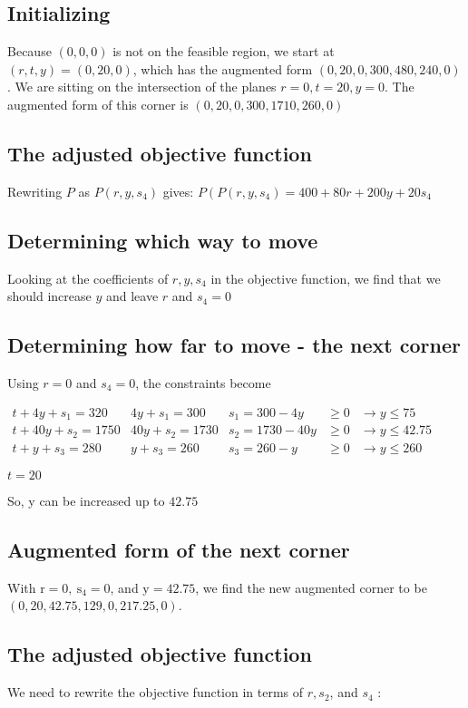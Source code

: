 \subsection{Initializing}
Because $(0,0,0)$ is not on the feasible region, we start at $(r, t, y)=(0,20,0)$, which has the augmented form $(0,20,0,300,480,240,0)$. We are sitting on the intersection of the planes $r=0, t=20, y=0$. The augmented form of this corner is $(0,20,0,300,1710,260,0)$

\subsection{The adjusted objective function}
Rewriting $P$ as $P\left(r, y, s_{4}\right)$ gives: $P\left(P\left(r, y, s_{4}\right)=400+80 r+200 y+20 s_{4}\right.$

\subsection{Determining which way to move}
Looking at the coefficients of $r, y, s_{4}$ in the objective function, we find that we should increase $y$ and leave $r$ and $s_{4}=0$

\subsection{Determining how far to move - the next corner}
Using $r=0$ and $s_{4}=0$, the constraints become

$\begin{array}{lllll}t+4 y+s_{1}=320 & 4 y+s_{1}=300 & s_{1}=300-4 y & \geq 0 & \rightarrow y \leq 75 \\ t+40 y+s_{2}=1750 & 40 y+s_{2}=1730 & s_{2}=1730-40 y & \geq 0 & \rightarrow y \leq 42.75 \\ t+y+s_{3}=280 & y+s_{3}=260 & s_{3}=260-y & \geq 0 & \rightarrow y \leq 260\end{array}$

$t=20$

So, y can be increased up to $42.75$

\subsection{Augmented form of the next corner}
With $\mathrm{r}=0, \mathrm{~s}_{4}=0$, and $\mathrm{y}=42.75$, we find the new augmented corner to be $(0,20,42.75,129,0,217.25,0)$.

\subsection{The adjusted objective function}
We need to rewrite the objective function in terms of $r, s_{2}$, and $s_{4}$ :

